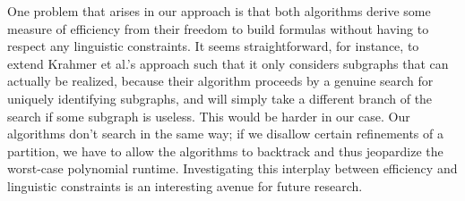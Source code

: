 One problem that arises in our approach is that both
algorithms derive some measure of efficiency from their freedom to
build formulas without having to respect any linguistic constraints.
It seems straightforward, for instance, to extend Krahmer et al.'s
 approach such that it only considers subgraphs
that can actually be realized, because their algorithm proceeds by a
genuine search for uniquely identifying subgraphs, and will simply
take a different branch of the search if some subgraph is useless.
This would be harder in our case.  Our algorithms don't search in the
same way; if we disallow certain refinements of a partition, we have
to allow the algorithms to backtrack and thus jeopardize the
worst-case polynomial runtime.  Investigating this interplay between
efficiency and linguistic constraints is an interesting avenue for
future research.





